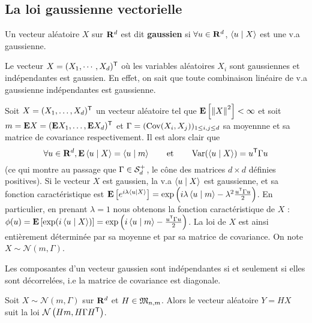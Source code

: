 \subsection{La loi gaussienne vectorielle}

	\begin{defn}
		Un vecteur aléatoire $X$ sur $\mathbf{R}^d$ est dit \textbf{gaussien} si $\forall u \in \mathbf{R}^d$, $\left\langle u \mid X \right\rangle$ est une v.a gaussienne.
	\end{defn}
	
	\begin{ex}
		Le vecteur $X = (X_1,\cdots,X_d)^\mathsf{T}$ où les variables aléatoires $X_i$ sont gaussiennes et indépendantes est gaussien.
		En effet, on sait que toute combinaison linéaire de v.a gaussienne indépendantes est gaussienne.
	\end{ex}
	
	Soit $X = (X_1,\ldots,X_d)^\mathsf{T}$ un vecteur aléatoire tel que $\mathbf{E} \left[ \left\lVert X\right\rVert^2 \right] < \infty$ et soit $m = \mathbf{E} X = (\mathbf{E} X_1, \ldots, \mathbf{E} X_d)^\mathsf{T}$ et $\Gamma = (\operatorname{Cov}(X_i,X_j))_{1 \leq i,j \leq d}$ sa moyennne et sa matrice de covariance respectivement.
	Il est alors clair que
	$$\forall u \in \mathbf{R}^d, \mathbf{E} \left\langle u \mid X \right\rangle = \left\langle u \mid m \right\rangle\qquad \text{et}\qquad \operatorname{Var}(\left\langle u \mid X \right\rangle) = u^\mathsf{T} \Gamma u$$
	(ce qui montre au passage que $\Gamma \in \mathcal{S}_d^+$, le cône des matrices $d \times d$ définies positives).
	Si le vecteur $X$ est gaussien, la v.a $\left\langle u \mid X \right\rangle$ est gaussienne, et sa fonction caractéristique est $\mathbf{E} \left[ e^{i \lambda \left\langle u \mid X \right\rangle} \right] = \exp \left( i \lambda \left\langle u \mid m \right\rangle - \lambda^2 \frac{u^\mathsf{T} \Gamma u}{2} \right)$.
	En particulier, en prenant $\lambda = 1$ nous obtenons la fonction caractéristique de $X$ : $\phi(u) = \mathbf{E} \left[ \exp(i\left\langle u \mid X \right\rangle) \right] = \exp \left( i \left\langle u \mid m \right\rangle - \frac{u^\mathsf{T} \Gamma u}{2} \right)$.
	La loi de $X$ est ainsi entièrement déterminée par sa moyenne et par sa matrice de covariance.
	On note $X \sim \mathcal{N}(m,\Gamma)$.
	
	\begin{pop}
		Les composantes d'un vecteur gaussien sont indépendantes si et seulement si elles sont décorrelées, i.e la matrice de covariance est diagonale.
	\end{pop}
	
	\begin{pop}
		Soit $X \sim \mathcal{N}(m,\Gamma)$ sur $\mathbf{R}^d$ et $H \in \mathfrak{M}_{n,m}$.
		Alors le vecteur aléatoire $Y = HX$ suit la loi $\mathcal{N} \left( Hm, H \Gamma H^\mathsf{T} \right)$.
	\end{pop}
	
